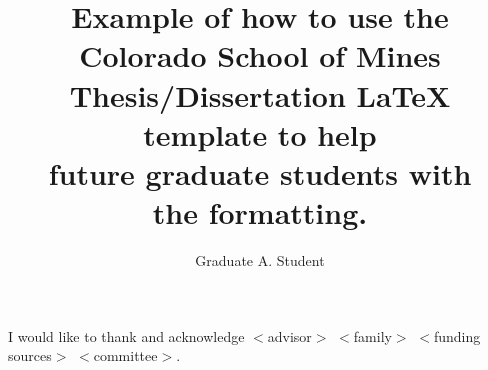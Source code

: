 \documentclass[letterpaper,10pt]{article} %
\title{
    Example of how to use the Colorado School of Mines\\
    Thesis/Dissertation \LaTeX{} template to help\\
    future graduate students with\\
    the formatting.
    }
\author{Graduate A. Student}        %
\begin{document}

\frontmatter                       %
\maketitle\newpage                 %
\makecopyright{\the\year}\newpage  %
\makesubmittal\newpage             %

\begin{abstract}

\end{abstract} \newpage

\tableofcontents\newpage        %
\listoffigures\newpage          %
\listoftables\newpage           %

\listofsymbols*                         %
\newpage

\listofabbreviations*                  %
\newpage



\begin{acknowledgments}
I would like to thank and acknowledge $<$advisor$>$ $<$family$>$ $<$funding sources$>$ $<$committee$>$.
\end{acknowledgments} \newpage
\end{document}
